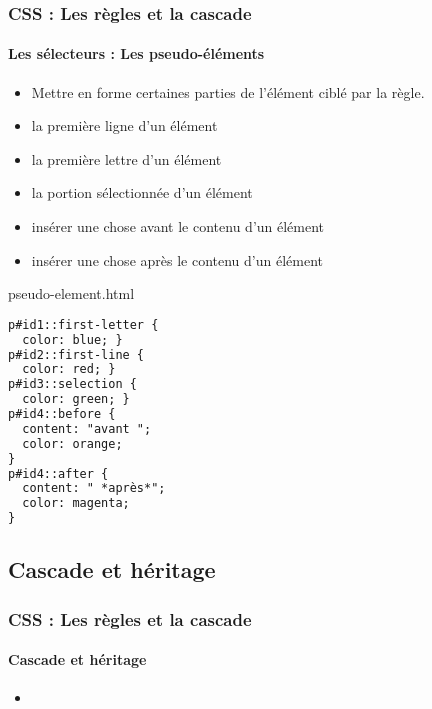\documentclass[xcolor=table]{beamer}
\begin{document}
\begin{frame}[fragile]
\frametitle{CSS : Les règles et la cascade}
\framesubtitle{Les sélecteurs : Les pseudo-éléments}

\begin{minipage}{0.60\textwidth} 
	\begin{itemize}
		\item Mettre en forme certaines parties de l'élément ciblé par la règle.
		\item {} la première ligne d'un élément
		\item {} la première lettre d'un élément
		\item {} la portion sélectionnée d'un élément
		\item {} insérer une chose avant le contenu d'un élément
		\item {} insérer une chose après le contenu d'un élément
	\end{itemize}
\end{minipage}
%
\begin{minipage}{0.38\textwidth}
\begin{block}{pseudo-element.html}
\lstset{escapeinside=**}
\scriptsize\bfseries
\begin{lstlisting}[language={html}]
p#id1::first-letter {
  color: blue; }
p#id2::first-line {
  color: red; }
p#id3::selection {
  color: green; }
p#id4::before {
  content: "avant ";
  color: orange;
}
p#id4::after {
  content: " *après*";
  color: magenta;
}
\end{lstlisting}
\end{block}
\end{minipage}
\end{frame}

\subsection{Cascade et héritage}

\begin{frame}
\frametitle{CSS : Les règles et la cascade}
\framesubtitle{Cascade et héritage}

\begin{itemize}
	\item 
\end{itemize}

\end{frame}
\end{document}
